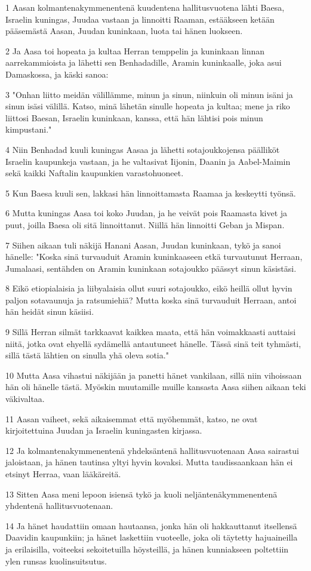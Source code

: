 \par 1 Aasan kolmantenakymmenentenä kuudentena hallitusvuotena lähti Baesa, Israelin kuningas, Juudaa vastaan ja linnoitti Raaman, estääkseen ketään pääsemästä Aasan, Juudan kuninkaan, luota tai hänen luokseen.
\par 2 Ja Aasa toi hopeata ja kultaa Herran temppelin ja kuninkaan linnan aarrekammioista ja lähetti sen Benhadadille, Aramin kuninkaalle, joka asui Damaskossa, ja käski sanoa:
\par 3 "Onhan liitto meidän välillämme, minun ja sinun, niinkuin oli minun isäni ja sinun isäsi välillä. Katso, minä lähetän sinulle hopeata ja kultaa; mene ja riko liittosi Baesan, Israelin kuninkaan, kanssa, että hän lähtisi pois minun kimpustani."
\par 4 Niin Benhadad kuuli kuningas Aasaa ja lähetti sotajoukkojensa päälliköt Israelin kaupunkeja vastaan, ja he valtasivat Iijonin, Daanin ja Aabel-Maimin sekä kaikki Naftalin kaupunkien varastohuoneet.
\par 5 Kun Baesa kuuli sen, lakkasi hän linnoittamasta Raamaa ja keskeytti työnsä.
\par 6 Mutta kuningas Aasa toi koko Juudan, ja he veivät pois Raamasta kivet ja puut, joilla Baesa oli sitä linnoittanut. Niillä hän linnoitti Geban ja Mispan.
\par 7 Siihen aikaan tuli näkijä Hanani Aasan, Juudan kuninkaan, tykö ja sanoi hänelle: "Koska sinä turvauduit Aramin kuninkaaseen etkä turvautunut Herraan, Jumalaasi, sentähden on Aramin kuninkaan sotajoukko päässyt sinun käsistäsi.
\par 8 Eikö etiopialaisia ja liibyalaisia ollut suuri sotajoukko, eikö heillä ollut hyvin paljon sotavaunuja ja ratsumiehiä? Mutta koska sinä turvauduit Herraan, antoi hän heidät sinun käsiisi.
\par 9 Sillä Herran silmät tarkkaavat kaikkea maata, että hän voimakkaasti auttaisi niitä, jotka ovat ehyellä sydämellä antautuneet hänelle. Tässä sinä teit tyhmästi, sillä tästä lähtien on sinulla yhä oleva sotia."
\par 10 Mutta Aasa vihastui näkijään ja panetti hänet vankilaan, sillä niin vihoissaan hän oli hänelle tästä. Myöskin muutamille muille kansasta Aasa siihen aikaan teki väkivaltaa.
\par 11 Aasan vaiheet, sekä aikaisemmat että myöhemmät, katso, ne ovat kirjoitettuina Juudan ja Israelin kuningasten kirjassa.
\par 12 Ja kolmantenakymmenentenä yhdeksäntenä hallitusvuotenaan Aasa sairastui jaloistaan, ja hänen tautinsa yltyi hyvin kovaksi. Mutta taudissaankaan hän ei etsinyt Herraa, vaan lääkäreitä.
\par 13 Sitten Aasa meni lepoon isiensä tykö ja kuoli neljäntenäkymmenentenä yhdentenä hallitusvuotenaan.
\par 14 Ja hänet haudattiin omaan hautaansa, jonka hän oli hakkauttanut itsellensä Daavidin kaupunkiin; ja hänet laskettiin vuoteelle, joka oli täytetty hajuaineilla ja erilaisilla, voiteeksi sekoitetuilla höysteillä, ja hänen kunniakseen poltettiin ylen runsas kuolinsuitsutus.


